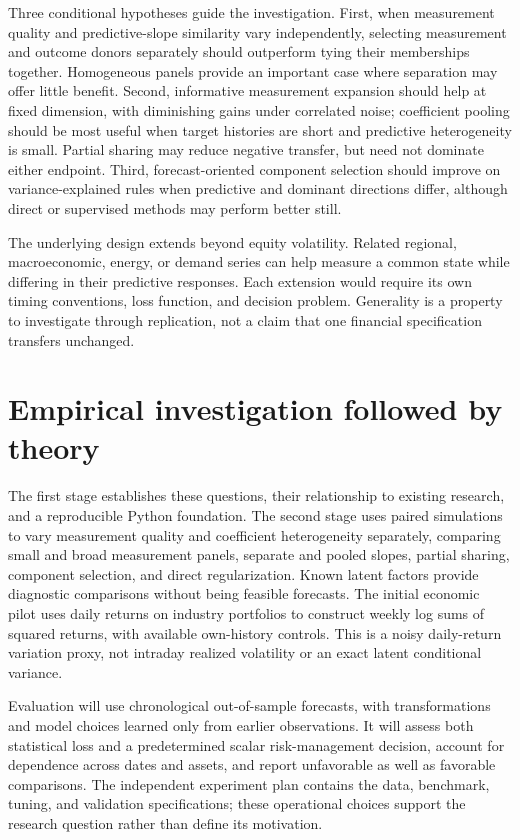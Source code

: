 \documentclass[11pt]{article}
\begin{document}
Three conditional hypotheses guide the investigation. First, when measurement quality and predictive-slope similarity vary independently, selecting measurement and outcome donors separately should outperform tying their memberships together. Homogeneous panels provide an important case where separation may offer little benefit. Second, informative measurement expansion should help at fixed dimension, with diminishing gains under correlated noise; coefficient pooling should be most useful when target histories are short and predictive heterogeneity is small. Partial sharing may reduce negative transfer, but need not dominate either endpoint. Third, forecast-oriented component selection should improve on variance-explained rules when predictive and dominant directions differ, although direct or supervised methods may perform better still.

The underlying design extends beyond equity volatility. Related regional, macroeconomic, energy, or demand series can help measure a common state while differing in their predictive responses. Each extension would require its own timing conventions, loss function, and decision problem. Generality is a property to investigate through replication, not a claim that one financial specification transfers unchanged.

\section{Empirical investigation followed by theory}
The first stage establishes these questions, their relationship to existing research, and a reproducible Python foundation. The second stage uses paired simulations to vary measurement quality and coefficient heterogeneity separately, comparing small and broad measurement panels, separate and pooled slopes, partial sharing, component selection, and direct regularization. Known latent factors provide diagnostic comparisons without being feasible forecasts. The initial economic pilot uses daily returns on industry portfolios to construct weekly log sums of squared returns, with available own-history controls. This is a noisy daily-return variation proxy, not intraday realized volatility or an exact latent conditional variance.

Evaluation will use chronological out-of-sample forecasts, with transformations and model choices learned only from earlier observations. It will assess both statistical loss and a predetermined scalar risk-management decision, account for dependence across dates and assets, and report unfavorable as well as favorable comparisons. The independent experiment plan contains the data, benchmark, tuning, and validation specifications; these operational choices support the research question rather than define its motivation.
\end{document}
